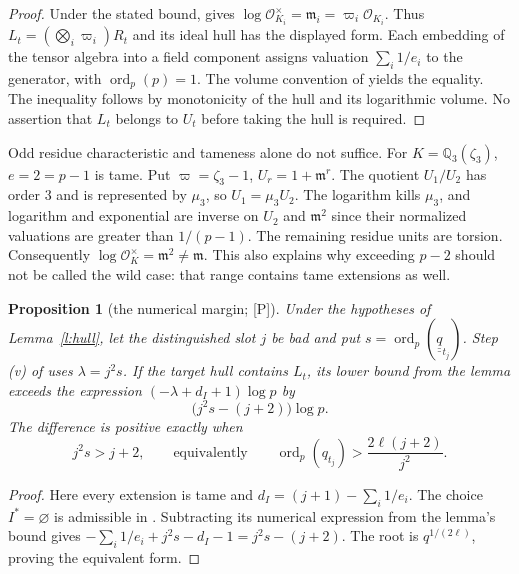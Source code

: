 \documentclass[11pt]{article}
\theoremstyle{plain}
\newtheorem{proposition}{Proposition}
\theoremstyle{definition}
\newcommand{\ord}{\operatorname{ord}}
\begin{document}
\begin{proof}
Under the stated bound, \cite[Proposition 1.2(i)]{IUT4} gives
$\log\mathcal O_{K_i}^\times=\mathfrak m_i=\varpi_i\mathcal O_{K_i}$.
Thus $L_t=(\bigotimes_i\varpi_i)R_t$ and its ideal hull has the displayed
form.  Each embedding of the tensor algebra into a field component assigns
valuation $\sum_i1/e_i$ to the generator, with $\ord_p(p)=1$.
The volume convention of \cite[Proposition 1.4(i)]{IUT4} yields the equality.
The inequality follows by monotonicity of the hull and its logarithmic volume.
No assertion that $L_t$ belongs to $U_t$ before taking the hull is required.
\end{proof}

Odd residue characteristic and tameness alone do not suffice.  For
$K=\mathbb Q_3(\zeta_3)$, $e=2=p-1$ is tame.  Put
$\varpi=\zeta_3-1$, $U_r=1+\mathfrak m^r$.
The quotient $U_1/U_2$ has order $3$ and is represented by $\mu_3$, so
$U_1=\mu_3U_2$.  The logarithm kills $\mu_3$, and logarithm and exponential
are inverse on $U_2$ and $\mathfrak m^2$ since their normalized valuations
are greater than $1/(p-1)$.  The remaining residue units are torsion.
Consequently $\log\mathcal O_K^\times=\mathfrak m^2\ne\mathfrak m$.
This also explains why exceeding $p-2$ should not be called the wild case:
that range contains tame extensions as well.

\begin{proposition}[the numerical margin; \textup{[P]}]\label{p:margin}
Under the hypotheses of Lemma~\ref{l:hull}, let the distinguished slot $j$
be bad and put $s=\ord_p(\underline{\underline q}_{t_j})$.
Step (v) of \cite[Theorem 1.10]{IUT4} uses $\lambda=j^2s$.
If the target hull contains $L_t$, its lower bound from the lemma exceeds
the expression $(-\lambda+d_I+1)\log p$ by
\[
 \bigl(j^2s-(j+2)\bigr)\log p.
\]
The difference is positive exactly when
\begin{equation}\label{e:threshold}
 j^2s>j+2,\qquad\text{equivalently}\qquad
 \ord_p(q_{t_j})>\frac{2\ell(j+2)}{j^2}.
\end{equation}
\end{proposition}

\begin{proof}
Here every extension is tame and $d_I=(j+1)-\sum_i1/e_i$.
The choice $I^*=\varnothing$ is admissible in
\cite[Proposition 1.4(iii)]{IUT4}.  Subtracting its numerical expression from
the lemma's bound gives
$-\sum_i1/e_i+j^2s-d_I-1=j^2s-(j+2)$.
The root is $q^{1/(2\ell)}$, proving the equivalent form.
\end{proof}
\end{document}
